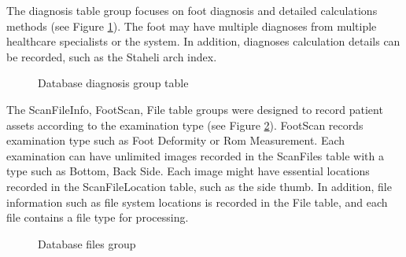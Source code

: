 The diagnosis table group focuses on foot diagnosis and detailed calculations methods (see Figure \ref{fig:DatabaseDiagnosis}). The foot may have multiple diagnoses from multiple healthcare specialists or the system. In addition, diagnoses calculation details can be recorded, such as the Staheli arch index.

\begin{figure}[htbp]
\centering
{}
\caption{Database diagnosis group table}
\label{fig:DatabaseDiagnosis}
\end{figure}

The ScanFileInfo, FootScan, File table groups were designed to record patient assets according to the examination type (see Figure \ref{fig:DatabaseFiles}). FootScan records examination type such as Foot Deformity or Rom Measurement. Each examination can have unlimited images recorded in the ScanFiles table with a type such as Bottom, Back Side. Each image might have essential locations recorded in the ScanFileLocation table, such as the side thumb. In addition, file information such as file system locations is recorded in the File table, and each file contains a file type for processing.

\begin{figure}[htbp]
\centering
{}
\caption{Database files group}
\label{fig:DatabaseFiles}
\end{figure}

